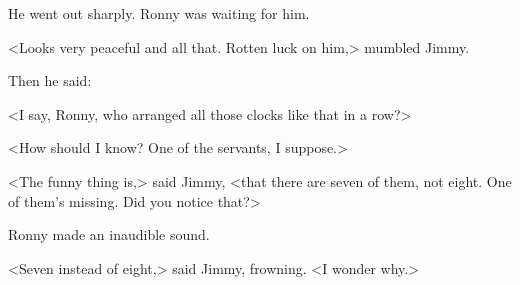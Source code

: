 He went out sharply. Ronny was waiting for him.

<Looks very peaceful and all that. Rotten luck on him,> mumbled Jimmy.

Then he said:

<I say, Ronny, who arranged all those clocks like that in a row?>

<How should I know? One of the servants, I suppose.>

<The funny thing is,> said Jimmy, <that there are seven of them, not eight. One of them's missing. Did you notice that?>

Ronny made an inaudible sound.

<Seven instead of eight,> said Jimmy, frowning. <I wonder why.>